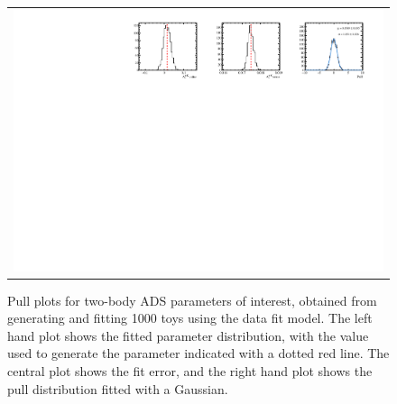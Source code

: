 \begin{figure}
\begin{tabular}{c}
\includegraphics[width=\textwidth]{ANA_resources/Plots/Data_fit/FitterBias//A_Bs_piK.pdf} \\
  \end{tabular}
  \caption{Pull plots for two-body ADS parameters of interest, obtained from generating and fitting 1000 toys using the data fit model. The left hand plot shows the fitted parameter distribution, with the value used to generate the parameter indicated with a dotted red line. The central plot shows the fit error, and the right hand plot shows the pull distribution fitted with a Gaussian.}
\label{fig:twoBody_ADS_pulls}
\end{figure}
